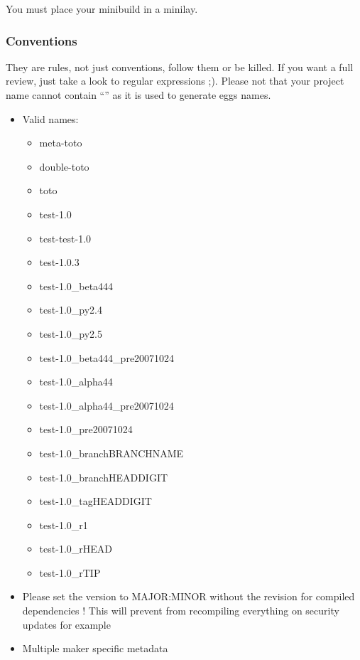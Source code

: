 \documentclass[letterpaper,10pt,english]{sphinxmanual}
\begin{document}
You must place your minibuild in a minilay.


\subsubsection{Conventions}
\label{spec:conventions}
They are rules, not just conventions, follow them or be killed.
If you want a full review, just take a look to  regular expressions ;).
Please not that your project name cannot contain ``\code{-}'' as it is used to generate eggs names.
\begin{itemize}
\item {} 
Valid names:
\begin{itemize}
\item {} 
meta-toto

\item {} 
double-toto

\item {} 
toto

\item {} 
test-1.0

\item {} 
test-test-1.0

\item {} 
test-1.0.3

\item {} 
test-1.0\_beta444

\item {} 
test-1.0\_py2.4

\item {} 
test-1.0\_py2.5

\item {} 
test-1.0\_beta444\_pre20071024

\item {} 
test-1.0\_alpha44

\item {} 
test-1.0\_alpha44\_pre20071024

\item {} 
test-1.0\_pre20071024

\item {} 
test-1.0\_branchBRANCHNAME

\item {} 
test-1.0\_branchHEADDIGIT

\item {} 
test-1.0\_tagHEADDIGIT

\item {} 
test-1.0\_r1

\item {} 
test-1.0\_rHEAD

\item {} 
test-1.0\_rTIP

\end{itemize}

\item {} 
Please set the version to MAJOR:MINOR without the revision for compiled dependencies !
This will prevent from recompiling everything on security updates for example

\item {} 
Multiple maker specific metadata

\end{itemize}
\end{document}
